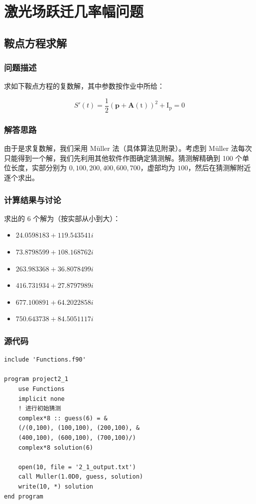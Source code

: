\documentclass{ctexart}
\begin{document}
\section{激光场跃迁几率幅问题}
\subsection{鞍点方程求解}
\subsubsection{问题描述}
求如下鞍点方程的复数解，其中参数按作业中所给：

$$
S'(t)=\frac{1}{2}(\mathbf{p}+\mathbf{A}(\mathrm{t}))^{2}+\mathrm{I}_{\mathrm{p}}=0
$$

\subsubsection{解答思路}
由于是求复数解，我们采用 Müller 法（具体算法见附录）。考虑到 Müller 法每次只能得到一个解，我们先利用其他软件作图确定猜测解。猜测解精确到 100 个单位长度，实部分别为 $0,100,200,400,600,700$，虚部均为 $100$，然后在猜测解附近逐个求出。
\subsubsection{计算结果与讨论}
求出的 6 个解为（按实部从小到大）：
\begin{itemize}
    \item $24.0598183 + 119.543541 i$
    \item $73.8798599 + 108.168762 i$
    \item $263.983368 + 36.8078499 i$
    \item $416.731934 + 27.8797989 i$
    \item $677.100891 + 64.2022858 i$
    \item $750.643738 + 84.5051117 i$
\end{itemize}

\subsubsection{源代码}
\begin{lstlisting}
include 'Functions.f90'

program project2_1
	use Functions
	implicit none
	! 进行初始猜测
	complex*8 :: guess(6) = &
	(/(0,100), (100,100), (200,100), &
	(400,100), (600,100), (700,100)/)
	complex*8 solution(6)

	open(10, file = '2_1_output.txt')
	call Muller(1.0D0, guess, solution)
	write(10, *) solution
end program
\end{lstlisting}
\end{document}
